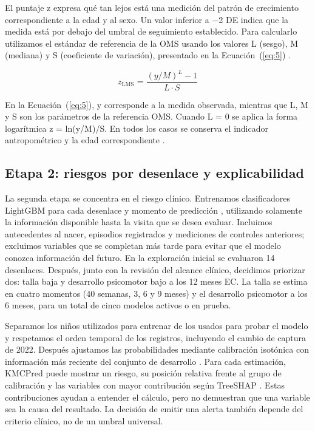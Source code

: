 El puntaje z expresa qué tan lejos está una medición del patrón de crecimiento correspondiente a la edad y al sexo. Un valor inferior a $-$2 DE indica que la medida está por debajo del umbral de seguimiento establecido. Para calcularlo utilizamos el estándar de referencia de la OMS usando los valores L (sesgo), M (mediana) y S (coeficiente de variación), presentado en la Ecuación~(\ref{eq:5}) \cite{r29}.

\begin{equation}
z_{\text{LMS}} = \frac{(y/M)^{L}-1}{L\cdot S}
\label{eq:5}
\end{equation}

En la Ecuación~(\ref{eq:5}), y corresponde a la medida observada, mientras que L, M y S son los parámetros de la referencia OMS. Cuando L = 0 se aplica la forma logarítmica z = ln(y/M)/S. En todos los casos se conserva el indicador antropométrico y la edad correspondiente \cite{r29,r30}.

\subsection{Etapa 2: riesgos por desenlace y explicabilidad}
\label{sec:3.4}

La segunda etapa se concentra en el riesgo clínico. Entrenamos clasificadores LightGBM para cada desenlace y momento de predicción \cite{r26}, utilizando solamente la información disponible hasta la visita que se desea evaluar. Incluimos antecedentes al nacer, episodios registrados y mediciones de controles anteriores; excluimos variables que se completan más tarde para evitar que el modelo conozca información del futuro. En la exploración inicial se evaluaron 14 desenlaces. Después, junto con la revisión del alcance clínico, decidimos priorizar dos: talla baja y desarrollo psicomotor bajo a los 12 meses EC. La talla se estima en cuatro momentos (40 semanas, 3, 6 y 9 meses) y el desarrollo psicomotor a los 6 meses, para un total de cinco modelos activos o en prueba.

Separamos los niños utilizados para entrenar de los usados para probar el modelo y respetamos el orden temporal de los registros, incluyendo el cambio de captura de 2022. Después ajustamos las probabilidades mediante calibración isotónica con información más reciente del conjunto de desarrollo \cite{r18}. Para cada estimación, KMCPred puede mostrar un riesgo, su posición relativa frente al grupo de calibración y las variables con mayor contribución según TreeSHAP \cite{r21,r22,r23}. Estas contribuciones ayudan a entender el cálculo, pero no demuestran que una variable sea la causa del resultado. La decisión de emitir una alerta también depende del criterio clínico, no de un umbral universal.

